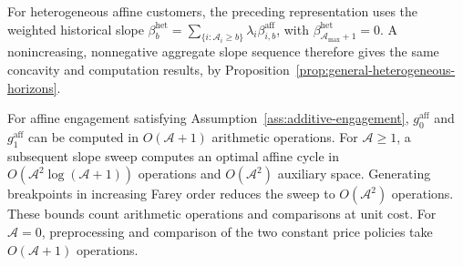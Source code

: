 For heterogeneous affine customers, the preceding representation uses the weighted historical slope \(\beta_b^{\mathrm{het}}=\sum_{\{i:\mathcal A_i\ge b\}}\lambda_i\beta_{i,b}^{\mathrm{aff}}\), with \(\beta_{\mathcal A_{\max}+1}^{\mathrm{het}}=0\). A nonincreasing, nonnegative aggregate slope sequence therefore gives the same concavity and computation results, by Proposition~\ref{prop:general-heterogeneous-horizons}.

\begin{samepage}
\begin{corollary}\label{thm:affine-complexity}
For affine engagement satisfying Assumption~\ref{ass:additive-engagement}, \(g_0^{\mathrm{aff}}\) and \(g_1^{\mathrm{aff}}\) can be computed in \(O(\mathcal A+1)\) arithmetic operations. For \(\mathcal A\ge1\), a subsequent slope sweep computes an optimal affine cycle in \(O(\mathcal A^2\log(\mathcal A+1))\) operations and \(O(\mathcal A^2)\) auxiliary space. Generating breakpoints in increasing Farey order reduces the sweep to \(O(\mathcal A^2)\) operations. These bounds count arithmetic operations and comparisons at unit cost. For \(\mathcal A=0\), preprocessing and comparison of the two constant price policies take \(O(\mathcal A+1)\) operations.
\end{corollary}
\end{samepage}

